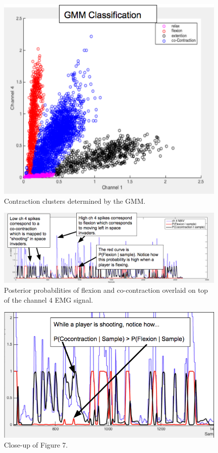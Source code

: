 \documentclass[times, 10pt,twocolumn]{article}
\begin{document}
\begin{figure}[h]
  \includegraphics[width=\linewidth]{Figures/f6.png}
  \caption{Contraction clusters determined by the GMM.}
  \label{gmm_clusters}
\end{figure}

\begin{figure}[h]
  \includegraphics[width=\linewidth]{Figures/f7.png}
  \caption{Posterior probabilities of flexion and co-contraction overlaid on top of the channel 4 EMG signal.}
  \label{posterior_probabilities}
\end{figure}

\begin{figure}[h]
  \includegraphics[width=\linewidth]{Figures/f8.png}
  \caption{Close-up of Figure 7.}
  \label{posterior_probabilities_close_up}
\end{figure}
\end{document}
